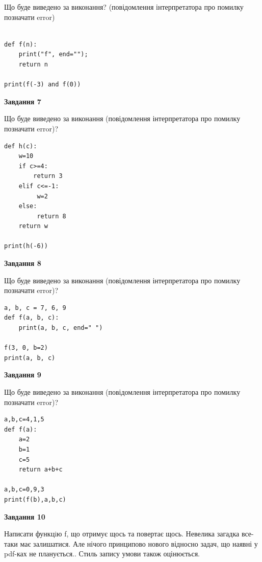 \documentclass[12pt, ukrainian]{article}
\begin{document}
{\begin {large}
Що буде виведено за виконання? (повідомлення інтерпретатора про помилку позначати error)\par
\begin{verbatim}

def f(n):
    print("f", end="");
    return n

print(f(-3) and f(0))
\end{verbatim}

{\begin {center}\textbf{Завдання 7}\end {center}}

Що буде виведено за виконання (повідомлення інтерпретатора про помилку позначати error)?\par
\begin{verbatim}
def h(c):
    w=10
    if c>=4: 
        return 3
    elif c<=-1:
         w=2
    else:
         return 8
    return w

print(h(-6))
\end{verbatim}

{\begin {center}\textbf{Завдання 8}\end {center}}

Що буде виведено за виконання (повідомлення інтерпретатора про помилку позначати error)?\par
\begin{verbatim}
a, b, c = 7, 6, 9
def f(a, b, c):
    print(a, b, c, end=" ")

f(3, 0, b=2)
print(a, b, c)
\end{verbatim}

{\begin {center}\textbf{Завдання 9}\end {center}}

Що буде виведено за виконання (повідомлення інтерпретатора про помилку позначати error)?\par
\begin{verbatim}
a,b,c=4,1,5
def f(a):
    a=2
    b=1
    c=5
    return a+b+c

a,b,c=0,9,3
print(f(b),a,b,c)
\end{verbatim}

{\begin {center}\textbf{Завдання 10}\end {center}}


Написати функцiю f, що отримує щось та повертає щось. Невелика загадка все-таки має залишатися. Але нічого принципово нового відносно задач, що наявні у pdf-ках не планується.. Стиль запису умови також оцінюється.\par
\end {large}}
\newpage
\end{document}
